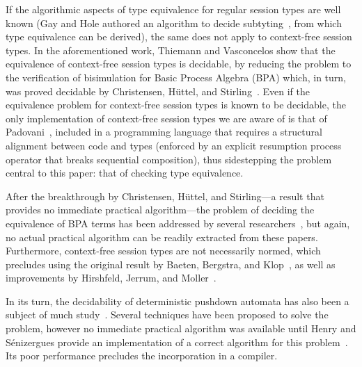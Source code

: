 If the algorithmic aspects of type equivalence for regular session
types are well known (Gay and Hole authored an algorithm to decide
subtyting~\cite{DBLP:journals/acta/GayH05}, from which type
equivalence can be derived), the same does not apply to context-free
session types.
%
In the aforementioned work, Thiemann and Vasconcelos show that the
equivalence of context-free session types is decidable, by reducing
the problem to the verification of bisimulation for Basic Process
Algebra (BPA) which, in turn, was proved decidable by Christensen,
H{\"{u}}ttel, and Stirling~\cite{DBLP:journals/iandc/ChristensenHS95}.
%
Even if the equivalence problem for context-free session types is
known to be decidable, the only implementation of context-free session
types we are aware of is that of
Padovani~\cite{DBLP:conf/esop/Padovani17}, included in a programming
language that requires a structural alignment between code and types
(enforced by an explicit resumption process operator that breaks
sequential composition), thus sidestepping the problem central to this
paper: that of checking type equivalence.

After the breakthrough by Christensen, H\"uttel, and Stirling---a
result that provides no immediate practical algorithm---the problem of
deciding the equivalence of BPA terms has been addressed by several
researchers~\cite{DBLP:conf/mfcs/BurkartCS95,DBLP:journals/iandc/ChristensenHS95,janvcar1999techniques},
but again, no actual practical algorithm can be readily extracted from
these papers.
%
Furthermore, context-free session types are not necessarily normed,
which precludes using the original result by Baeten, Bergstra, and
Klop~\cite{baeten1993decidability}, as well as improvements by
Hirshfeld, Jerrum, and
Moller~\cite{DBLP:journals/tcs/HirshfeldJM96,DBLP:conf/concur/HirshfeldM94}.

In its turn, the decidability of deterministic pushdown automata has
also been a subject of much
study~\cite{janvcar2008selected,senizergues1997equivalence,stirling2001decidability}.
Several techniques have been proposed to solve the problem, however no
immediate practical algorithm was available until Henry and
S{\'e}nizergues provide an implementation of a correct algorithm for
this problem~\cite{henry2013lalblc}. Its poor performance precludes
the incorporation in a compiler.

